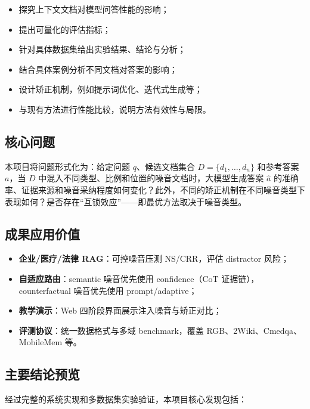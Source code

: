 \documentclass[UTF8,zihao=-4]{ctexart}
\begin{document}
\begin{itemize}
  \item 探究上下文文档对模型问答性能的影响；
  \item 提出可量化的评估指标；
  \item 针对具体数据集给出实验结果、结论与分析；
  \item 结合具体案例分析不同文档对答案的影响；
  \item 设计矫正机制，例如提示词优化、迭代式生成等；
  \item 与现有方法进行性能比较，说明方法有效性与局限。
\end{itemize}

\subsection{核心问题}
本项目将问题形式化为：给定问题 $q$、候选文档集合 $D=\{d_1,\dots,d_n\}$ 和参考答案 $a$，当 $D$ 中混入不同类型、比例和位置的噪音文档时，大模型生成答案 $\hat{a}$ 的准确率、证据来源和噪音采纳程度如何变化？此外，不同的矫正机制在不同噪音类型下表现如何？是否存在“互锁效应”——即最优方法取决于噪音类型。


\subsection{成果应用价值}
\begin{itemize}
  \item \textbf{企业/医疗/法律 RAG}：可控噪音压测 NS/CRR，评估 distractor 风险；
  \item \textbf{自适应路由}：semantic 噪音优先使用 confidence（CoT 证据链），counterfactual 噪音优先使用 prompt/adaptive；
  \item \textbf{教学演示}：Web 四阶段界面展示注入噪音与矫正对比；
  \item \textbf{评测协议}：统一数据格式与多域 benchmark，覆盖 RGB、2Wiki、Cmedqa、MobileMem 等。
\end{itemize}

\subsection{主要结论预览}
经过完整的系统实现和多数据集实验验证，本项目核心发现包括：
\end{document}
